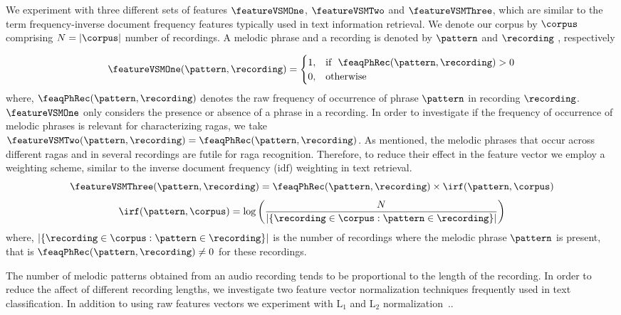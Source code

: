 We experiment with three different sets of features $\featureVSMOne$, $\featureVSMTwo$ and $\featureVSMThree$, which are similar to the term frequency-inverse document frequency features typically used in text information retrieval. We denote our corpus by $\corpus$  comprising $N = |\corpus|$ number of recordings. A melodic phrase and a recording is denoted by $\pattern$ and $\recording$ , respectively

\begin{equation}
\featureVSMOne(\pattern,\recording)= 
\begin{cases}
1				,& \text{if}~~\feaqPhRec(\pattern,\recording) > 0\\
0,              & \text{otherwise}
\end{cases}
\end{equation}
where, $\feaqPhRec(\pattern,\recording)$ denotes the raw frequency of occurrence of phrase $\pattern$ in recording $\recording$. $\featureVSMOne$ only considers the presence or absence of a phrase in a recording. In order to investigate if the frequency of occurrence of melodic phrases is relevant for characterizing \glspl{raga}, we take $\featureVSMTwo(\pattern,\recording) = \feaqPhRec(\pattern,\recording)$. As mentioned, the melodic phrases that occur across different \glspl{raga} and in several recordings are futile for \gls{raga} recognition. Therefore, to reduce their effect in the feature vector we employ a weighting scheme, similar to the inverse document frequency ($\mathrm{idf}$) weighting in text retrieval.
\begin{equation}
\featureVSMThree(\pattern,\recording) = \feaqPhRec(\pattern,\recording) \times \irf(\pattern,\corpus)
\end{equation}
\begin{equation}
\irf(\pattern,\corpus) = \log \left( \frac{N}{ |\lbrace \recording \in \corpus: \pattern \in \recording \rbrace|} \right)
\end{equation}
where, $|\lbrace \recording \in \corpus: \pattern \in \recording \rbrace|$ is the number of recordings where the melodic phrase $\pattern$ is present, that is $\feaqPhRec(\pattern,\recording)\neq 0$ for these recordings. 

The number of melodic patterns obtained from an audio recording tends to be proportional to the length of the recording. In order to reduce the affect of different recording lengths, we investigate two feature vector normalization techniques frequently used in text classification. In addition to using raw features vectors we experiment with $\mathrm{L}_1$ and $\mathrm{L}_2$ normalization~\cite{leopold2002text}.. 


